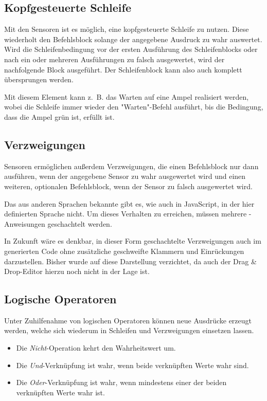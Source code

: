 \subsection*{Kopfgesteuerte Schleife}
\label{sec:implementation:elements:while}

Mit den Sensoren ist es möglich, eine kopfgesteuerte Schleife zu nutzen. Diese wiederholt den Befehlsblock solange der angegebene Ausdruck zu wahr auswertet. Wird die Schleifenbedingung vor der ersten Ausführung des Schleifenblocks oder nach ein oder mehreren Ausführungen zu falsch ausgewertet, wird der nachfolgende Block ausgeführt. Der Schleifenblock kann also auch komplett übersprungen werden.

Mit diesem Element kann z.~B. das Warten auf eine Ampel realisiert werden, wobei die Schleife immer wieder den "Warten"-Befehl ausführt, bis die Bedingung, dass die Ampel grün ist, erfüllt ist.

\subsection*{Verzweigungen}
\label{sec:implementation:elements:if-else}

Sensoren ermöglichen außerdem Verzweigungen, die einen Befehlsblock nur dann ausführen, wenn der angegebene Sensor zu wahr ausgewertet wird und einen weiteren, optionalen Befehlsblock, wenn der Sensor zu falsch ausgewertet wird.

Das aus anderen Sprachen bekannte  gibt es, wie auch in JavaScript, in der hier definierten Sprache nicht. Um dieses Verhalten zu erreichen, müssen mehrere -Anweisungen geschachtelt werden.

In Zukunft wäre es denkbar, in dieser Form geschachtelte Verzweigungen auch im generierten Code ohne zusätzliche geschweifte Klammern und Einrückungen darzustellen. Bisher wurde auf diese Darstellung verzichtet, da auch der Drag \& Drop-Editor hierzu noch nicht in der Lage ist.

\subsection*{Logische Operatoren}
\label{sec:implementation:elements:op}

Unter Zuhilfenahme von logischen Operatoren können neue Ausdrücke erzeugt werden, welche sich wiederum in Schleifen und Verzweigungen einsetzen lassen.

\begin{itemize}[noitemsep]
  \item Die \emph{Nicht}-Operation kehrt den Wahrheitswert um.
  \item Die \emph{Und}-Verknüpfung ist wahr, wenn beide verknüpften Werte wahr sind.
  \item Die \emph{Oder}-Verknüpfung ist wahr, wenn mindestens einer der beiden verknüpften Werte wahr ist.
\end{itemize}

